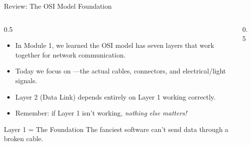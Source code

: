 \documentclass[aspectratio=169]{beamer}  %
\begin{document}
\begin{frame}{Review: The OSI Model Foundation}
    \begin{columns}[T]
        \begin{column}{0.5\textwidth}
            \begin{itemize}
                \item In Module 1, we learned the OSI model has seven layers that work together for network communication.
                \item Today we focus on ---the actual cables, connectors, and electrical/light signals.
                \item Layer 2 (Data Link) depends entirely on Layer 1 working correctly.
                \item Remember: if Layer 1 isn't working, \textit{nothing else matters!}
            \end{itemize}
            
            \vspace{0.3em}
            \begin{alertblock}{Layer 1 = The Foundation}
                The fanciest software can't send data through a broken cable.
            \end{alertblock}
        \end{column}
        \begin{column}{0.5\textwidth}
            \begin{center}
            \end{center}
        \end{column}
    \end{columns}
\end{frame}
\end{document}
